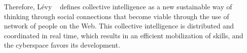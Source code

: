 Therefore, Lévy ~\cite{levy2001cyberculture} defines collective intelligence as a new sustainable way of thinking through social connections that become viable through the use of network of people on the Web. This collective intelligence is distributed and coordinated in real time, which results in an efficient mobilization of skills, and the cyberspace favors its development. 







